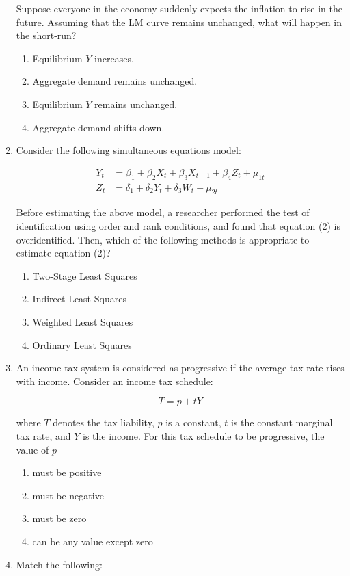 \documentclass[journal,13pt,onecolumn]{exam}
\theoremstyle{remark}
\begin{document}
\begin{enumerate}[label=Q.\arabic*]
Suppose everyone in the economy suddenly expects the inflation to rise in the future. Assuming that the LM curve remains unchanged, what will happen in the short-run?

\begin{enumerate}
  \item Equilibrium \(Y\) increases.
  \item Aggregate demand remains unchanged.
  \item Equilibrium \(Y\) remains unchanged.
  \item Aggregate demand shifts down.
\end{enumerate}
\newpage
\item Consider the following simultaneous equations model:

\begin{align}
Y_t &= \beta_1 + \beta_2 X_t + \beta_3 X_{t-1} + \beta_4 Z_t + \mu_{1t} \tag{1} \\
Z_t &= \delta_1 + \delta_2 Y_t + \delta_3 W_t + \mu_{2t} \tag{2}
\end{align}

Before estimating the above model, a researcher performed the test of identification using order and rank conditions, and found that equation (2) is overidentified. Then, which of the following methods is appropriate to estimate equation (2)?

\begin{enumerate}
  \item Two-Stage Least Squares
  \item Indirect Least Squares
  \item Weighted Least Squares
  \item Ordinary Least Squares
\end{enumerate}

\item An income tax system is considered as progressive if the average tax rate rises with income. Consider an income tax schedule:

\[
T = p + tY
\]

where \( T \) denotes the tax liability, \( p \) is a constant, \( t \) is the constant marginal tax rate, and \( Y \) is the income. For this tax schedule to be progressive, the value of \( p \)

\begin{enumerate}
    \item must be positive
    \item must be negative
    \item must be zero
    \item can be any value except zero
\end{enumerate}
\item Match the following:


\end{enumerate}
\end{document}
